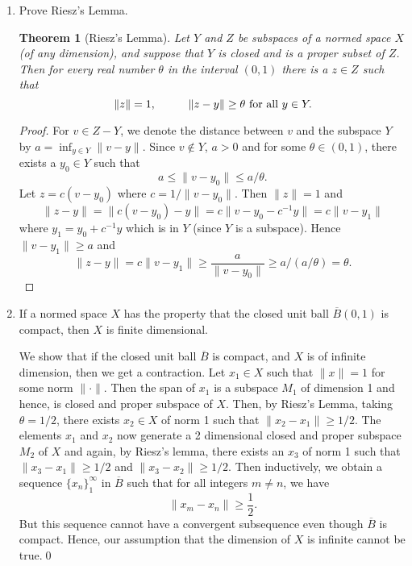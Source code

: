 \documentclass[12pt]{article}
\newtheorem{thm}{Theorem}
\begin{document}
\begin{enumerate}
\begin{mybox}
\end{mybox}
 
\item Prove Riesz's Lemma.
\begin{mybox}

    \begin{thm}[Riesz's Lemma]

        Let $Y$ and $Z$ be subspaces of a normed space
        $X$ (of any dimension), and suppose that $Y$ is
        closed and is a proper subset of $Z$. Then for
        every real number $\theta$ in the interval
        $(0,1)$ there is a $z\in Z$ such that
        $$\|z\|=1, \hspace*{10mm} \|z-y\|\geq \theta
        \text{ for all } y\in Y.$$
    \end{thm}
    \begin{proof}
        For $v\in Z-Y$, we denote the distance between
        $v$ and the subspace $Y$ by
        $a=\inf_{y\in Y}{\|v-y\|}$. Since $v\notin Y$,
        $a>0$ and for some $\theta\in (0,1)$, there
        exists a $y_0\in Y$ such that
        $$a\leq \|v-y_0\|\leq a/\theta.$$
        Let $z=c(v-y_0)$ where $c=1/\|v-y_0\|$. Then
        $\|z\|=1$ and
        $$\|z-y\|=\|c(v-y_0)-y\|=c\|v-y_0-c^{-1}y\|
        =c\|v-y_1\|$$
        where $y_1=y_0+c^{-1}y$ which is in $Y$ (since
        $Y$ is a subspace). Hence $\|v-y_1\|\geq a$ and
        $$\|z-y\|=c\|v-y_1\|\geq \frac{a}{\|v-y_0\|}
        \geq a/(a/\theta)=\theta.$$
    \end{proof}
        
\end{mybox}
 
\item If a normed space $X$ has the property that the
    closed unit ball $\overline{B}(0,1)$ is compact,
    then $X$ is finite dimensional.
\begin{mybox}

    We show that if the closed unit ball $\overline{B}$
    is compact, and
    $X$ is of infinite dimension, then we get a
    contraction. Let $x_1\in X$ such that $\|x\|=1$
    for some norm $\|\cdot\|$. Then the span of $x_1$
    is a subspace $M_1$ of dimension 1 and hence,
    is closed and
    proper subspace of $X$. Then, by Riesz's Lemma,
    taking $\theta=1/2$, there exists $x_2\in X$ of norm
    1 such that $\|x_2-x_1\|\geq 1/2$. The elements
    $x_1$ and $x_2$ now generate a 2 dimensional
    closed and proper subspace $M_2$ of $X$ and again,
    by Riesz's lemma, there exists an $x_3$ of norm 1 such
    that $\|x_3-x_1\|\geq 1/2$ and $\|x_3-x_2\|\geq 1/2$.
    Then inductively, we obtain a sequence
    $\{x_n\}_1^\infty$ in $\overline{B}$
    such that for all integers $m\neq n$, we have
    $$\|x_m-x_n\|\geq \frac{1}{2}.$$
    But this sequence cannot have a convergent subsequence
    even though $\overline{B}$ is compact. Hence, our
    assumption that the dimension of $X$ is infinite
    cannot be true.\qed
\end{mybox}

\end{enumerate}
\end{document}

